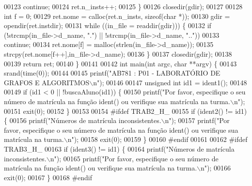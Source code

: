 \begin{DoxyCode}
{{{{{{{{{{{{{00123                         \textcolor{keywordflow}{continue};
00124                 ret.n\_insts++;
00125         \}
00126         closedir(gdir);
00127 
00128         \textcolor{keywordtype}{int} f = 0;
00129         ret.nome = calloc(ret.n\_insts, \textcolor{keyword}{sizeof}(\textcolor{keywordtype}{char} *));
00130         gdir = opendir(ret.instdir);
00131         \textcolor{keywordflow}{while} ((in\_file = readdir(gdir))) \{
00132                 \textcolor{keywordflow}{if} (!strcmp(in\_file->d\_name, \textcolor{stringliteral}{"."}) || !strcmp(in\_file->d\_name, \textcolor{stringliteral}{".."}))
00133                         \textcolor{keywordflow}{continue};
00134                 ret.nome[f] = malloc(strlen(in\_file->d\_name));
00135                 strcpy(ret.nome[f++],in\_file->d\_name);
00136         \}
00137         closedir(gdir);
00138 
00139         \textcolor{keywordflow}{return} ret;
00140 \}
00141 
00142 \textcolor{keywordtype}{int} main(\textcolor{keywordtype}{int} argc, \textcolor{keywordtype}{char} **argv) \{
00143         srand(time(0));
00144 
00145         printf(\textcolor{stringliteral}{"AB781 : P01 - LABORATÓRIO DE GRAFOS E ALGORITMOS\(\backslash\)n"});
00146 
00147         \textcolor{keywordtype}{unsigned} \textcolor{keywordtype}{int} id1 = ident1();
00148 
00149         \textcolor{keywordflow}{if} (id1 < 0 || !buscaAluno(id1)) \{
00150                 printf(\textcolor{stringliteral}{"Por favor, especifique o seu número de matrícula na função ident() ou verifique sua
       matrícula na turma.\(\backslash\)n"});
00151                 exit(0);
00152         \}
00153 
00154 \textcolor{preprocessor}{#ifdef TRAB2\_H\_}
00155         \textcolor{keywordflow}{if} (ident2() != id1) \{
00156                 printf(\textcolor{stringliteral}{"Números de matrícula inconsistentes.\(\backslash\)n"});
00157                 printf(\textcolor{stringliteral}{"Por favor, especifique o seu número de matrícula na função ident() ou verifique sua
       matrícula na turma.\(\backslash\)n"});
00158                 exit(0);
00159         \}
00160 \textcolor{preprocessor}{#endif}
00161 
00162 \textcolor{preprocessor}{#ifdef TRAB3\_H\_}
00163         \textcolor{keywordflow}{if} (ident3() != id1) \{
00164                 printf(\textcolor{stringliteral}{"Números de matrícula inconsistentes.\(\backslash\)n"});
00165                 printf(\textcolor{stringliteral}{"Por favor, especifique o seu número de matrícula na função ident() ou verifique sua
       matrícula na turma.\(\backslash\)n"});
00166                 exit(0);
00167         \}
00168 \textcolor{preprocessor}{#endif}
}}}}}}}}}}}}}
\end{DoxyCode}
